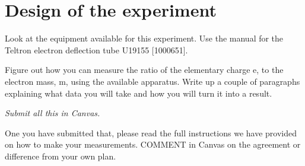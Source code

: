\documentclass{tufte-handout}
\begin{document}
\begin{enumerate}



\end{enumerate}

\section{Design of the experiment}

Look at the equipment available for this experiment. Use the manual for the Teltron electron deflection tube 
U19155 [1000651].

Figure out how you can measure the ratio of the elementary charge e, to the electron mass, m, using the available apparatus.  Write up a couple of paragraphs explaining what data you will take and how you will turn it into a result.

{\it Submit all this in Canvas.}

One you have submitted that, please read the full instructions we have provided on how to make your measurements.  COMMENT in Canvas on the agreement or difference from your own plan.
\end{document}
